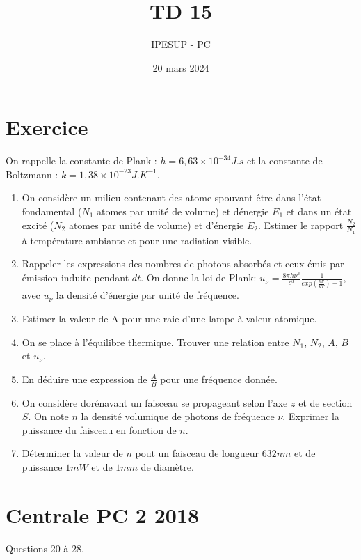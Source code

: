 \documentclass{article}
\title{TD 15 }
\author{IPESUP - PC }
\date{20 mars 2024}
\begin{document}
\maketitle



\section{Exercice}

On rappelle la constante de Plank : $h = 6,63 \times 10^{-34} J.s$ et la constante de Boltzmann : $k = 1,38 \times 10^{-23} J.K^{-1}$.
\begin{enumerate}
  \item On considère un milieu contenant des atome spouvant être dans l'état fondamental ($N_1$ atomes par unité de volume)
   et dénergie $E_1$ et dans un état excité ($N_2$ atomes par unité de volume) et d'énergie $E_2$.
   Estimer le rapport $\frac{N_2}{N_1}$ à température ambiante et pour une radiation visible. 
   \item Rappeler les expressions des nombres de photons absorbés et ceux émis par émission induite pendant $dt$.
   On donne la loi de Plank: $u_\nu = \frac{8\pi h \nu^3}{c^3} \frac{1}{exp({\frac{h\nu}{kT}})-1}$, avec $u_\nu$ la densité d'énergie par unité de fréquence.
   \item Estimer la valeur de A pour une raie d'une lampe à valeur atomique. 
   \item On se place à l'équilibre thermique. Trouver une relation entre $N_1$,  $N_2$, $A$, $B$ et $u_\nu$.
   \item En déduire une expression de $\frac{A}{B}$ pour une fréquence donnée. 
   \item On considère dorénavant un faisceau se propageant selon l'axe $z$ et de section $S$. On note $n$ la densité volumique de photons de fréquence $\nu$. Exprimer la puissance du faisceau en fonction de $n$. 
   \item Déterminer la valeur de $n$ pout un faisceau de longueur $632 nm$ et de puissance $1 mW$ et de $1mm$ de diamètre. 
\end{enumerate}


\section{Centrale PC 2 2018}

Questions 20 à 28. 
\end{document}
